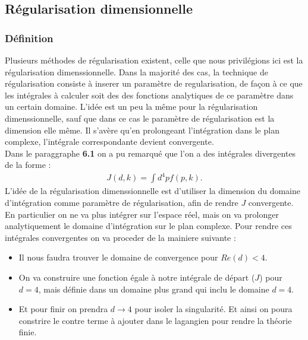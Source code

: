 \documentclass[a4paper,11pt]{article}
\theoremstyle{plain}
\theoremstyle{definition}
\theoremstyle{remark}
\numberwithin{equation}{section}
\numberwithin{equation}{subsection}
\numberwithin{figure}{section}
\begin{document}
\subsection{Régularisation dimensionnelle}


\subsubsection{Définition}

\noindent
Plusieurs méthodes de régularisation existent, celle que nous privilégions ici est la régularisation dimenssionnelle. Dans la majorité 
des cas, la technique de régularisation consiste à inserer un paramètre de regularisation, de façon à ce que les intégrales à calculer 
soit des des fonctions analytiques de ce paramètre dans un certain domaine. L'idée est un peu la même pour la régularisation dimenssionnelle, 
sauf que dans ce cas le paramètre de régularisation est la dimension elle même. Il s'avère qu'en prolongeant l'intégration dans le plan 
complexe, l'intégrale correspondante devient convergente.\\
Dans le paraggraphe \textbf{6.1} on a pu remarqué que l'on a des intégrales divergentes de la forme :
\begin{eqnarray}
 J(d,k) = \int d^{4}p f(p,k).
\end{eqnarray}
L'idée de la régularisation dimenssionnelle est d'utiliser la dimension du domaine d'intégration comme paramètre de régularisation, 
afin de rendre $J$ convergente. En particulier on ne va plus intégrer sur l'espace réel, mais on va prolonger analytiquement le domaine 
d'intégration sur le plan complexe. Pour rendre ces intégrales convergentes on va proceder de la mainiere suivante :
\begin{itemize}
 \renewcommand{\labelitemi}{$\cdot$}
 \item Il nous faudra trouver le domaine de convergence pour $Re(d)<4$.
 \item On va construire une fonction égale à notre intégrale de départ ($J$) pour $d=4$, mais définie dans un domaine plus grand qui 
inclu le domaine $d=4$.
 \item Et pour finir on prendra $d \rightarrow 4$ pour isoler la singularité. Et ainsi on poura constrire le contre terme à ajouter dans le 
lagangien pour rendre la théorie finie.
\end{itemize}
\end{document}
